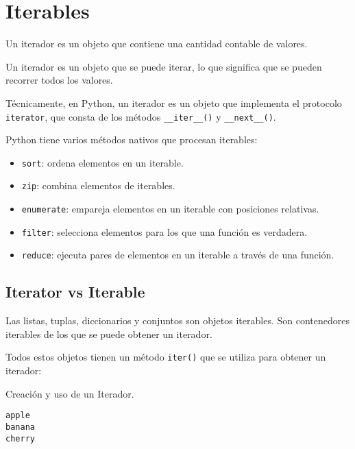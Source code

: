 \chapter{Iterables}

Un iterador es un objeto que contiene una cantidad contable de valores.

Un iterador es un objeto que se puede iterar, lo que significa que se
pueden recorrer todos los valores.

Técnicamente, en Python, un iterador es un objeto que implementa el
protocolo \texttt{iterator}, que consta de los métodos
\texttt{\_\_iter\_\_()} y \texttt{\_\_next\_\_()}.

Python tiene varios métodos nativos que procesan iterables:

\begin{itemize}
\item
  \texttt{sort}: ordena elementos en un iterable.
\item
  \texttt{zip}: combina elementos de iterables.
\item
  \texttt{enumerate}: empareja elementos en un iterable con posiciones
  relativas.
\item
  \texttt{filter}: selecciona elementos para los que una función es
  verdadera.
\item
  \texttt{reduce}: ejecuta pares de elementos en un iterable a través de
  una función.
\end{itemize}

\section{Iterator vs Iterable}

Las listas, tuplas, diccionarios y conjuntos son objetos iterables. Son
contenedores iterables de los que se puede obtener un iterador.

Todos estos objetos tienen un método \texttt{iter()} que se utiliza para
obtener un iterador:\\

\begin{code} Creación y uso de un Iterador.
\begin{Shaded}
\begin{Highlighting}[]
\OperatorTok{=}\NormalTok{ (}\NormalTok{, }\NormalTok{, }\NormalTok{)}
\OperatorTok{=} 

\NormalTok{(}
\NormalTok{(}
\NormalTok{(}
\end{Highlighting}
\end{Shaded}

\begin{verbatim}
apple
banana
cherry

\end{verbatim}
\end{code}

